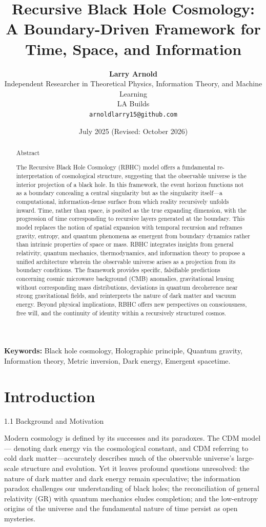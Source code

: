 \documentclass[11pt,a4paper]{article}
\title{\textbf{Recursive Black Hole Cosmology:\\A Boundary-Driven Framework for Time, Space, and Information}}
\author{
    \textbf{Larry Arnold}\\
    Independent Researcher in Theoretical Physics, Information Theory, and Machine Learning\\
    LA Builds\\
    \texttt{arnoldlarry15@github.com}
}
\date{July 2025 (Revised: October 2026)}
\begin{document}
\maketitle

\begin{abstract}
\begin{abstract}
Abstract

The Recursive Black Hole Cosmology (RBHC) model offers a fundamental re-interpretation of cosmological structure, suggesting that the observable universe is the interior projection of a black hole. In this framework, the event horizon functions not as a boundary concealing a central singularity but as the singularity itself—a computational, information-dense surface from which reality recursively unfolds inward. Time, rather than space, is posited as the true expanding dimension, with the progression of time corresponding to recursive layers generated at the boundary. This model replaces the notion of spatial expansion with temporal recursion and reframes gravity, entropy, and quantum phenomena as emergent from boundary dynamics rather than intrinsic properties of space or mass. RBHC integrates insights from general relativity, quantum mechanics, thermodynamics, and information theory to propose a unified architecture wherein the observable universe arises as a projection from its boundary conditions. The framework provides specific, falsifiable predictions concerning cosmic microwave background (CMB) anomalies, gravitational lensing without corresponding mass distributions, deviations in quantum decoherence near strong gravitational fields, and reinterprets the nature of dark matter and vacuum energy. Beyond physical implications, RBHC offers new perspectives on consciousness, free will, and the continuity of identity within a recursively structured cosmos.
\end{abstract}
\end{abstract}

\vspace{1em}
\noindent \textbf{Keywords:} Black hole cosmology, Holographic principle, Quantum gravity, Information theory, Metric inversion, Dark energy, Emergent spacetime.

\section{Introduction}
1.1 Background and Motivation

Modern cosmology is defined by its successes and its paradoxes. The \Lambda CDM model— \Lambda denoting dark energy via the cosmological constant, and CDM referring to cold dark matter—accurately describes much of the observable universe’s large-scale structure and evolution. Yet it leaves profound questions unresolved: the nature of dark matter and dark energy remain speculative; the information paradox challenges our understanding of black holes; the reconciliation of general relativity (GR) with quantum mechanics eludes completion; and the low-entropy origins of the universe and the fundamental nature of time persist as open mysteries.
\end{document}
